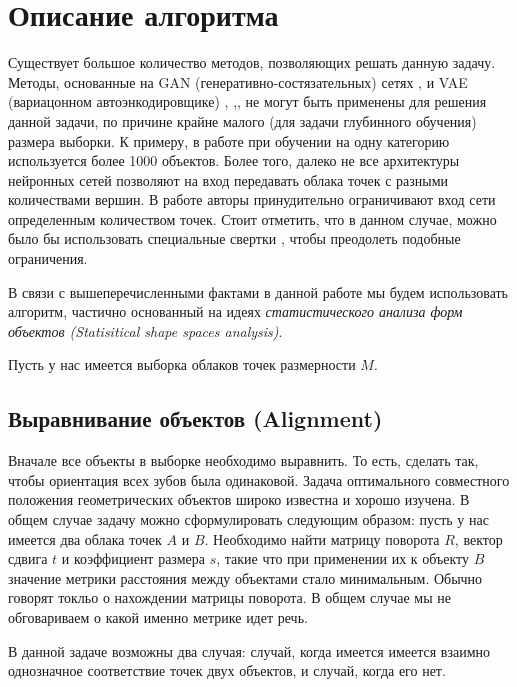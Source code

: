 \section{Описание алгоритма} \label{section:algorithm}

Существует большое количество методов, позволяющих решать данную задачу. Методы, основанные на GAN (генеративно-состязательных) сетях \cite{gan-1},\cite{3d-gan} и VAE (вариацонном автоэнкодировщике) \cite{adversarial-autoencoder}, \cite{3d-autoencoder},\cite{lrgm-cloud}, не могут быть применены для решения данной задачи, по причине крайне малого (для задачи глубинного обучения) размера выборки. К примеру, в работе \cite{lrgm-cloud} при обучении на одну категорию используется более 1000 объектов. Более того, далеко не все архитектуры нейронных сетей позволяют на вход передавать облака точек с разными количествами вершин. В работе \cite{lrgm-cloud} авторы принудительно ограничивают вход сети определенным количеством точек. Стоит отметить, что в данном случае, можно было бы использовать специальные свертки , чтобы преодолеть подобные ограничения. 

В связи с вышеперечисленными фактами в данной работе мы будем использовать алгоритм, частично основанный на идеях
\textit{статистического анализа форм объектов (Statisitical shape spaces analysis)}.



Пусть у нас имеется выборка облаков точек размерности $M$.

\subsection{Выравнивание объектов (Alignment)}

Вначале все объекты в выборке необходимо выравнить. То есть, сделать так, чтобы ориентация всех зубов была одинаковой.
Задача оптимального совместного положения геометрических объектов широко известна и хорошо изучена. В общем случае задачу можно сформулировать следующим образом: пусть у нас имеется два облака точек $A$ и $B$. Необходимо найти матрицу поворота $R$, вектор сдвига $t$ и коэффициент размера $s$, такие что при применении их к объекту $B$ значение метрики расстояния между объектами стало минимальным. Обычно говорят токльо о нахождении матрицы поворота. В общем случае мы не обговариваем о какой именно метрике идет речь.

В данной задаче возможны два случая: случай, когда имеется имеется взаимно однозначное соответствие точек двух объектов, и случай, когда его нет.

